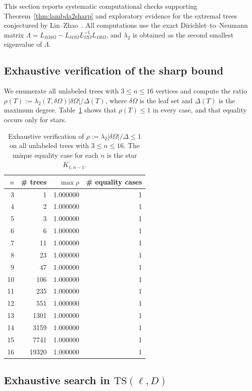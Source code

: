 \documentclass[11pt]{article}
\theoremstyle{definition}
\theoremstyle{remark}
\newcommand{\dO}{\delta\Omega}
\newcommand{\Om}{\Omega}
\begin{document}
This section reports systematic computational checks supporting Theorem~\ref{thm:lambda2sharp} and exploratory evidence for the extremal trees conjectured by Lin--Zhao~\cite{LinZhaoPlanar}.
All computations use the exact Dirichlet--to--Neumann matrix $\Lambda=L_{\dO\dO}-L_{\dO\Om}L_{\Om\Om}^{-1}L_{\Om\dO}$, and $\lambda_2$ is obtained as the second smallest eigenvalue of $\Lambda$.

\subsection{Exhaustive verification of the sharp bound}

We enumerate all unlabeled trees with $3\le n\le 16$ vertices and compute the ratio $\rho(T):=\lambda_2(T,\dO)|\dO|/\Delta(T)$, where $\dO$ is the leaf set and $\Delta(T)$ is the maximum degree.
Table~\ref{tab:enum} shows that $\rho(T)\le 1$ in every case, and that equality occurs only for stars.

\begin{table}[ht]
\centering
\begin{tabular}{r r r r}
\hline
$n$ & \# trees & $\max\rho$ & \# equality cases\\
\hline
3  & 1     & 1.000000 & 1 \\
4  & 2     & 1.000000 & 1 \\
5  & 3     & 1.000000 & 1 \\
6  & 6     & 1.000000 & 1 \\
7  & 11    & 1.000000 & 1 \\
8  & 23    & 1.000000 & 1 \\
9  & 47    & 1.000000 & 1 \\
10 & 106   & 1.000000 & 1 \\
11 & 235   & 1.000000 & 1 \\
12 & 551   & 1.000000 & 1 \\
13 & 1301  & 1.000000 & 1 \\
14 & 3159  & 1.000000 & 1 \\
15 & 7741  & 1.000000 & 1 \\
16 & 19320 & 1.000000 & 1 \\
\hline
\end{tabular}
\caption{Exhaustive verification of $\rho:=\lambda_2|\dO|/\Delta\le 1$ on all unlabeled trees with $3\le n\le 16$.
The unique equality case for each $n$ is the star $K_{1,n-1}$.}
\label{tab:enum}
\end{table}


\subsection{Exhaustive search in \texorpdfstring{$\mathrm{TS}(\ell,D)$}{TS(l,D)}}
\end{document}
